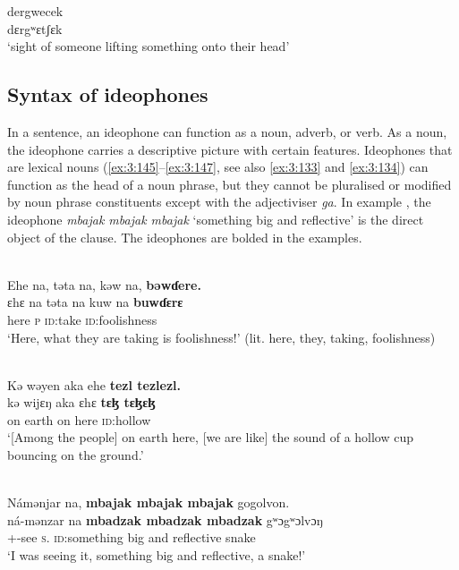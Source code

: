 \ea \label{ex:3:144}
\gll dergwecek\\
  dɛrgʷɛtʃɛk\\
\glt  ‘sight of someone lifting something onto their head’
\z

\subsection{Syntax of ideophones}\label{sec:3.6.2}
\hypertarget{RefHeading1211281525720847}{}
In a sentence, an ideophone can function as a noun, adverb, or verb. As a noun, the ideophone carries a descriptive picture with certain features.  Ideophones that are lexical nouns (\ref{ex:3:145}--\ref{ex:3:147}, see also \ref{ex:3:133} and \ref{ex:3:134}) can function as the head of a noun phrase, but they cannot be pluralised or modified by noun phrase constituents except with the adjectiviser \textit{ga}. In example , the ideophone \textit{mbajak mbajak mbajak} ‘something big and reflective’ is the direct object of the clause. The ideophones are bolded in the examples.

\ea \label{ex:3:145}\\
 Ehe na, təta na, kəw na, \textbf{bəwɗere.}\\
\gll      ɛhɛ  na      təta   na  kuw      na    \textbf{buwɗɛrɛ}\\
      here   {\PSP}    \textsc{p}    {\PSP}    \textsc{id}:take   {\PSP}    \textsc{id}:foolishness\\
\glt  ‘Here, what they are taking is foolishness!’ (lit. here, they, taking,  foolishness)
\z

\ea \label{ex:3:146}\\
Kə  wəyen  aka  ehe  \textbf{tezl  tezlezl.}\\
\gll  kə   wijɛŋ   aka   ɛhɛ    \textbf{tɛɮ tɛɮɛɮ}\\
      on  earth  on  here    \textsc{id}:hollow\\
\glt  ‘[Among the people] on earth here, [we are like] the sound of a hollow cup bouncing on the ground.’
\z

\ea \label{ex:3:147}\\
Námənjar  na,  \textbf{mbajak  mbajak  mbajak}  gogolvon.\\
\gll  ná-mənzar   na  \textbf{mbadzak  mbadzak  mbadzak}  gʷɔgʷɔlvɔŋ\\
      {\oneS}+{\IFV}-see  \textsc{s}.{\DO}  {\textsc{id}:something big and reflective}  snake\\
\glt  ‘I was seeing it, something big and reflective, a snake!’
\z

